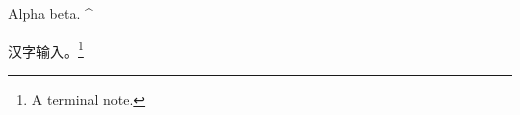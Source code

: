 \documentclass{article}
\begin{document}
Alpha beta. \textasciicircum{}

汉字输入。\footnote{A terminal note.}
\end{document}
